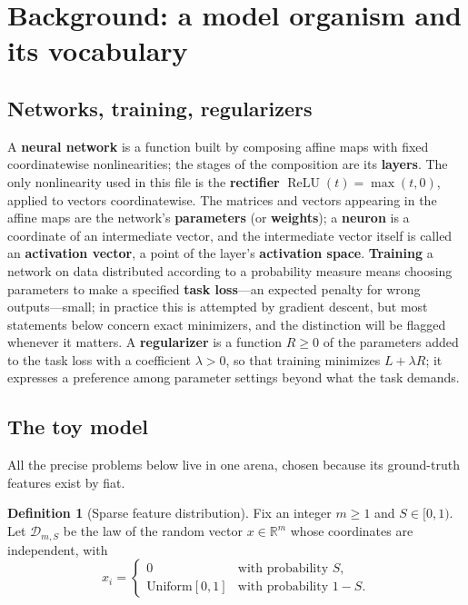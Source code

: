 \documentclass[11pt]{amsart}
\theoremstyle{plain}
\theoremstyle{definition}
\newtheorem{definition}[theorem]{Definition}
\DeclareMathOperator{\relu}{ReLU}
\newcommand{\R}{\mathbb{R}}
\begin{document}
\section{Background: a model organism and its vocabulary}\label{sec:background}

\subsection{Networks, training, regularizers}

A \textbf{neural network} is a function built by composing affine maps with fixed coordinatewise nonlinearities; the stages of the composition are its \textbf{layers}. The only nonlinearity used in this file is the \textbf{rectifier} $\relu(t)=\max(t,0)$, applied to vectors coordinatewise. The matrices and vectors appearing in the affine maps are the network's \textbf{parameters} (or \textbf{weights}); a \textbf{neuron} is a coordinate of an intermediate vector, and the intermediate vector itself is called an \textbf{activation vector}, a point of the layer's \textbf{activation space}. \textbf{Training} a network on data distributed according to a probability measure means choosing parameters to make a specified \textbf{task loss}---an expected penalty for wrong outputs---small; in practice this is attempted by gradient descent, but most statements below concern exact minimizers, and the distinction will be flagged whenever it matters. A \textbf{regularizer} is a function $R\ge 0$ of the parameters added to the task loss with a coefficient $\lambda>0$, so that training minimizes $L+\lambda R$; it expresses a preference among parameter settings beyond what the task demands.

\subsection{The toy model}

All the precise problems below live in one arena, chosen because its ground-truth features exist by fiat.

\begin{definition}[Sparse feature distribution]\label{def:data}
Fix an integer $m\ge 1$ and $S\in[0,1)$. Let $\mathcal D_{m,S}$ be the law of the random vector $x\in\R^m$ whose coordinates are independent, with
\[
x_i = \begin{cases} 0 & \text{with probability } S,\\ \text{Uniform}[0,1] & \text{with probability } 1-S.\end{cases}
\]
\end{definition}
\end{document}
